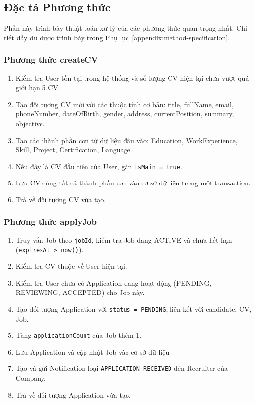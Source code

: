 \subsection{Đặc tả Phương thức}
\label{subsec:method-specification}

Phần này trình bày thuật toán xử lý của các phương thức quan trọng nhất. Chi tiết đầy đủ được trình bày trong Phụ lục~\ref{appendix:method-specification}.

\subsubsection{Phương thức createCV}

\begin{enumerate}
    \item Kiểm tra User tồn tại trong hệ thống và số lượng CV hiện tại chưa vượt quá giới hạn 5 CV.
    \item Tạo đối tượng CV mới với các thuộc tính cơ bản: title, fullName, email, phoneNumber, dateOfBirth, gender, address, currentPosition, summary, objective.
    \item Tạo các thành phần con từ dữ liệu đầu vào: Education, WorkExperience, Skill, Project, Certification, Language.
    \item Nếu đây là CV đầu tiên của User, gán \texttt{isMain = true}.
    \item Lưu CV cùng tất cả thành phần con vào cơ sở dữ liệu trong một transaction.
    \item Trả về đối tượng CV vừa tạo.
\end{enumerate}

\subsubsection{Phương thức applyJob}

\begin{enumerate}
    \item Truy vấn Job theo \texttt{jobId}, kiểm tra Job đang ACTIVE và chưa hết hạn (\texttt{expiresAt > now()}).
    \item Kiểm tra CV thuộc về User hiện tại.
    \item Kiểm tra User chưa có Application đang hoạt động (PENDING, REVIEWING, ACCEPTED) cho Job này.
    \item Tạo đối tượng Application với \texttt{status = PENDING}, liên kết với candidate, CV, Job.
    \item Tăng \texttt{applicationCount} của Job thêm 1.
    \item Lưu Application và cập nhật Job vào cơ sở dữ liệu.
    \item Tạo và gửi Notification loại \texttt{APPLICATION\_RECEIVED} đến Recruiter của Company.
    \item Trả về đối tượng Application vừa tạo.
\end{enumerate}


